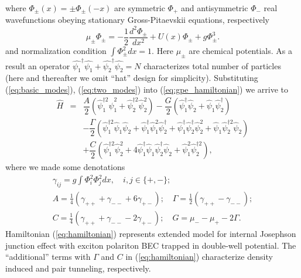 \documentclass[aps, pre, preprint, groupedaddress, superscriptaddress, showkeys, showpacs] {revtex4-1}
\begin{document}
%
where $\Phi_{\pm}(x) = \pm \Phi_{\pm}(-x)$ are symmetric $\Phi_+$ and antisymmetric $\Phi_-$ real wavefunctions obeying stationary Gross-Pitaevskii equations, respectively
%
\begin{equation}
\mu_{\pm} \Phi_{\pm} = -\dfrac{1}{2} \dfrac{d^2 \Phi_{\pm}}{dx^2} + U(x) \Phi_{\pm} + g \Phi_{\pm}^3.
\label{eq:stationary}
\end{equation}
%
and normalization condition $\int \Phi_{\pm}^2 dx = 1$.
Here $\mu_{\pm}$ are chemical potentials.
As a result an operator $\hat{\psi_1}^\dag\hat{\psi_1} + \hat{\psi_2}^\dag\hat{\psi_2} = N$ characterizes total number of particles (here and thereafter we omit ``hat'' design for simplicity).
Substituting (\ref{eq:basic_modes}), (\ref{eq:two_modes}) into (\ref{eq:gpe_hamiltonian}) we arrive to
% 
\begin{equation}
\begin{array}{lcl}
\hat{H} & = & \dfrac{A}{2} (\hat{\psi}_1^{\dag 2} \hat{\psi}_1^2 + \hat{\psi}_2^{\dag 2} \hat{\psi}_2^2) - \dfrac{G}{2} (\hat{\psi}_1^\dag \hat{\psi}_2 + \hat{\psi}_1 \hat{\psi}_2^\dag) \\ [8pt]
& & -\dfrac{\Gamma}{2} (\hat{\psi}_1^{\dag 2} \hat{\psi}_1 \hat{\psi}_2 + \hat{\psi}_1^\dag \hat{\psi}_1^2 \hat{\psi}_2^\dag + \hat{\psi}_1^\dag \hat{\psi}_2^\dag \hat{\psi}_2^2 + \hat{\psi}_1 \hat{\psi}_2^{\dag 2} \hat{\psi}_2) \\ [8pt]
& & +\dfrac{C}{2} (\hat{\psi}_1^{\dag 2} \hat{\psi}_2^2 + 4 \hat{\psi}_1^\dag \hat{\psi}_1 \hat{\psi}_2^\dag \hat{\psi}_2 + \hat{\psi}_1^2 \hat{\psi}_2^{\dag 2}),
\end{array}
\label{eq:hamiltonian}
\end{equation}
%
where we made some denotations
%
\begin{equation}
\begin{array}{l}
\gamma_{ij} = g \int \Phi_i^2 \Phi_j^2 dx, \quad i,j \in \{+,-\}; \\
A = \frac{1}{4} (\gamma_{++} + \gamma_{--} + 6 \gamma_{+-}); \quad \Gamma = \frac{1}{2} (\gamma_{++} - \gamma_{--}); \\
C = \frac{1}{4} (\gamma_{++} + \gamma_{--} - 2\gamma_{+-}); \quad G = \mu_- - \mu_+ - 2\Gamma.
\end{array}
\label{eq:subs}
\end{equation}
Hamiltonian (\ref{eq:hamiltonian}) represents extended model for internal Josephson junction effect with exciton polariton BEC trapped in double-well potential.
The ``additional'' terms with $\Gamma$ and $C$ in (\ref{eq:hamiltonian}) characterize density induced and pair tunneling, respectively.
\end{document}
